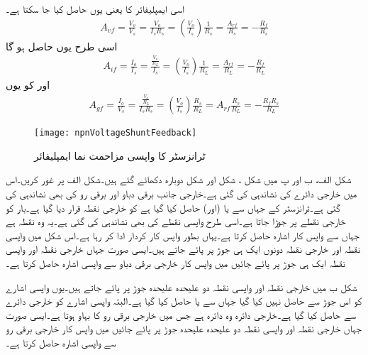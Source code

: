 اسی ایمپلیفائر کا  یعنی  یوں حاصل کیا جا سکتا ہے۔
\begin{align}
A_{vf}=\frac{V_o}{V_s}=\frac{V_o}{I_s R_s}=\left (\frac{V_o}{I_s} \right ) \frac{1}{R_s}=\frac{A_{rf}}{R_s}=-\frac{R_f}{R_s}
\end{align}
اسی طرح  یوں حاصل ہو گا
\begin{align}
A_{if}=\frac{I_o}{I_s}=\frac{\frac{V_o}{R_L}}{I_s}=\left (\frac{V_o}{I_s} \right) \frac{1}{R_L}=\frac{A_{rf}}{R_L}=-\frac{R_f}{R_L}
\end{align}
اور  کو یوں
\begin{align}
A_{gf}=\frac{I_o}{V_s}=\frac{\frac{V_o}{R_L}}{I_s R_s}=\left (\frac{V_o}{I_s} \right) \frac{R_s}{R_L}=A_{rf}\frac{R_s}{R_L}=-\frac{R_f R_s}{R_L}
\end{align}
%
\begin{figure}
\centering
\texttt{[image: npnVoltageShuntFeedback]}
\caption{ٹرانزسٹر کا واپسی مزاحمت نما ایمپلیفائر}
\label{شکل_واپسی_ٹرانزسٹر_مزاحمت_نما_ایمپلیفائر}
\end{figure}
شکل  الف، ب اور پ میں شکل ، شکل  اور شکل  دوبارہ دکھائے گئے ہیں۔شکل  الف پر غور کریں۔اس میں خارجی دائرے کی نشاندہی کی گئی ہے۔خارجی جانب برقی دباو  اور برقی رو  کی بھی نشاندہی کی گئی ہے۔ٹرانزسٹر کے  جہاں سے  یا (اور)  حاصل کیا گیا ہے کو خارجی نقطہ قرار دیا گیا ہے۔بار  کو خارجی نقطے  پر جوڑا جاتا ہے۔اسی طرح واپسی نقطے  کی بھی نشاندہی کی گئی ہے۔یہ وہ نقطہ ہے جہاں سے واپس کار اشارہ حاصل کرتا ہے۔یہاں  بطور واپس کار کردار ادا کر رہا ہے۔اس شکل میں واپسی نقطہ اور خارجی نقطہ دونوں ایک ہی جوڑ پر پائے جاتے ہیں۔ایسی صورت جہاں خارجی نقطہ  اور واپسی نقطہ ایک ہی جوڑ پر پائے جائیں میں واپس کار خارجی برقی دباو  سے واپسی اشارہ حاصل کرتا ہے۔

شکل  ب میں خارجی نقطہ اور واپسی نقطہ دو علیحدہ علیحدہ جوڑ پر پائے جاتے ہیں۔یوں واپسی اشارے کو اس جوڑ سے حاصل نہیں کیا گیا جہاں سے  یا  حاصل کیا گیا ہے۔البتہ واپسی اشارے کو خارجی دائرے سے حاصل کیا گیا ہے۔خارجی دائرہ وہ دائرہ ہے جس میں خارجی برقی رو  کا بہاو ہوتا ہے۔ایسی صورت جہاں خارجی نقطہ  اور واپسی نقطہ دو علیحدہ علیحدہ جوڑ پر پائے جائیں میں واپس کار خارجی برقی رو  سے واپسی اشارہ حاصل کرتا ہے۔

